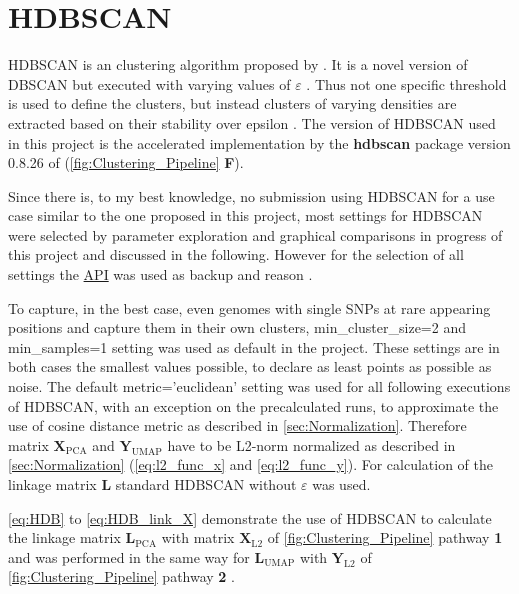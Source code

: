 \section{HDBSCAN} \label{sec:HDBSCAN}

\gls{HDBSCAN} is an clustering algorithm proposed by \textcite{campello_hierarchical_2015, hutchison_density-based_2013}. It is a novel version of \gls{DBSCAN} but executed with varying values of $\varepsilon$ \autocite{hutchison_density-based_2013}. Thus not one specific threshold is used to define the clusters, but instead clusters of varying densities are extracted based on their stability over epsilon \autocite{mcinnes_hdbscan_2017}. The version of \gls{HDBSCAN} used in this project is the accelerated implementation by the \textbf{hdbscan} package version 0.8.26 of \textcite{mcinnes_accelerated_2017} (\autoref{fig:Clustering_Pipeline} \textsf{\textbf{F}}).

Since there is, to my best knowledge, no submission using \gls{HDBSCAN} for a use case similar to the one proposed in this project, most settings for \gls{HDBSCAN} were selected by parameter exploration and graphical comparisons in progress of this project and discussed in the following. However for the selection of all settings the \href{https://hdbscan.readthedocs.io/en/latest/api.html}{API} was used as backup and reason \autocite{mcinnes_hdbscan_2017}. 

To capture, in the best case, even genomes with single \glspl{SNP} at rare appearing positions and capture them in their own clusters,  \colorbox{backcolour}{min\_cluster\_size=2} and \colorbox{backcolour}{min\_samples=1} setting was used as default in the project. These settings are in both cases the smallest values possible, to declare as least points as possible as noise. The default \colorbox{backcolour}{metric='euclidean'} setting was used for all following executions of \gls{HDBSCAN}, with an exception on the precalculated runs, to approximate the use of cosine distance metric as described in \autoref{sec:Normalization}. Therefore matrix $\mathbf{X}_{\text{PCA}}$ and $\mathbf{Y}_{\text{UMAP}}$ have to be L2-norm normalized as described in \autoref{sec:Normalization} (\autoref{eq:l2_func_x} and \autoref{eq:l2_func_y}). For calculation of the linkage matrix $\mathbf{L}$ standard \gls{HDBSCAN} without $\varepsilon$ was used.

\autoref{eq:HDB} to \autoref{eq:HDB_link_X} demonstrate the use of \gls{HDBSCAN} to calculate the linkage matrix $\mathbf{L}_{\text{PCA}}$ with matrix $\mathbf{X}_{\text{L2}}$ of \autoref{fig:Clustering_Pipeline} pathway \textsf{\textbf{1}} and was performed in the same way for $\mathbf{L}_{\text{UMAP}}$ with $\mathbf{Y}_{\text{L2}}$ of \autoref{fig:Clustering_Pipeline} pathway \textsf{\textbf{2}} \autocite{mcinnes_hdbscan_2017, gower_minimum_1969}.

